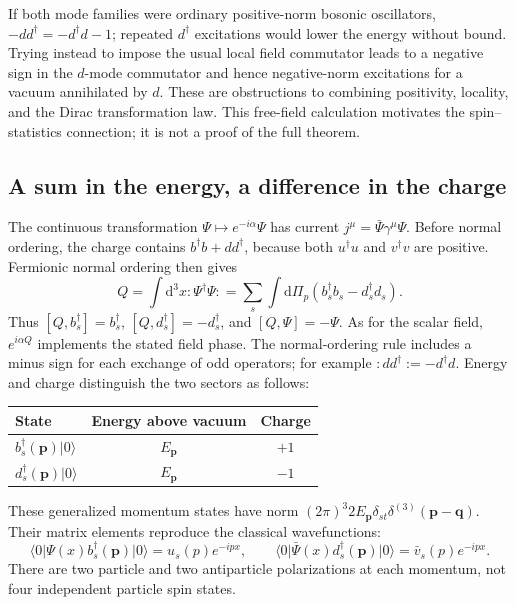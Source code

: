 \documentclass[11pt]{article}
\newcommand{\dd}{\mathrm{d}}
\newcommand{\vac}{\lvert0\rangle}
\newcommand{\vbra}{\langle0\rvert}
\begin{document}
\begin{warningbox}
If both mode families were ordinary positive-norm bosonic oscillators,
\(-dd^\dagger=-d^\dagger d-1\); repeated \(d^\dagger\) excitations would
lower the energy without bound. Trying instead to impose the usual
local field commutator leads to a negative sign in the \(d\)-mode
commutator and hence negative-norm excitations for a vacuum annihilated
by \(d\). These are obstructions to combining positivity, locality,
and the Dirac transformation law. This free-field calculation motivates
the spin--statistics connection; it is not a proof of the full theorem.
\end{warningbox}

\subsection{A sum in the energy, a difference in the charge}
The continuous transformation \(\Psi\mapsto e^{-i\alpha}\Psi\) has current
\(j^\mu=\bar\Psi\gamma^\mu\Psi\). Before normal ordering, the charge
contains \(b^\dagger b+dd^\dagger\), because both \(u^\dagger u\) and
\(v^\dagger v\) are positive. Fermionic normal ordering then gives
\begin{equation}
 Q=\int\dd^3x:\Psi^\dagger\Psi:
   =\sum_s\int\dd\Pi_p(b_s^\dagger b_s-d_s^\dagger d_s).
 \label{f-eq:Q}
\end{equation}
Thus \([Q,b_s^\dagger]=b_s^\dagger\), \([Q,d_s^\dagger]=-d_s^\dagger\), and
\([Q,\Psi]=-\Psi\). As for the scalar field, \(e^{i\alpha Q}\) implements the
stated field phase. The normal-ordering rule includes a minus sign for
each exchange of odd operators; for example \(:dd^\dagger:=-d^\dagger d\).
Energy and charge distinguish the two sectors as follows:
\begin{center}
\begin{tabular}{lcc}
\toprule
State & Energy above vacuum & Charge\\
\midrule
\(b_s^\dagger(\bm p)\vac\) & \(E_{\bm p}\) & \(+1\)\\
\(d_s^\dagger(\bm p)\vac\) & \(E_{\bm p}\) & \(-1\)\\
\bottomrule
\end{tabular}
\end{center}
These generalized momentum states have norm
\((2\pi)^3 2E_{\bm p}\delta_{st}\delta^{(3)}(\bm p-\bm q)\).
Their matrix elements reproduce the classical wavefunctions:
\begin{equation}
 \vbra\Psi(x)b_s^\dagger(\bm p)\vac=u_s(p)e^{-ipx},\qquad
 \vbra\bar\Psi(x)d_s^\dagger(\bm p)\vac=\bar v_s(p)e^{-ipx}.
 \label{f-eq:matrixelements}
\end{equation}
There are two particle and two antiparticle polarizations at each
momentum, not four independent particle spin states.
\end{document}
